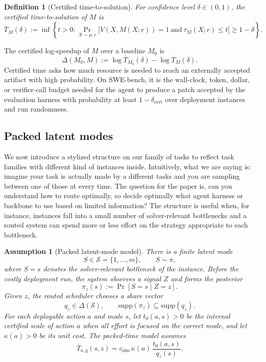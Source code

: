\documentclass{article}
\newtheorem{assumption}{Assumption}
\newtheorem{definition}{Definition}
\newcommand{\cS}{\mathcal{S}}
\begin{document}
\begin{definition}[Certified time-to-solution]
\label{def:certified-time}
For confidence level \(\delta\in(0,1)\), the certified time-to-solution
of \(M\) is
\[
    \overline T_M(\delta)
    :=
    \inf\left\{
        t>0:
        \Pr_{X\sim\mu,r}
        \big[
            V(X,M(X;r))=1
            \ \mathrm{and}\
            \tau_M(X;r)\le t
        \big]
        \ge 1-\delta
    \right\}.
\]
\end{definition}
The certified log-speedup of \(M\) over a baseline \(M_0\) is
\[
    \Delta(M_0,M)
    :=
    \log \overline T_{M_0}(\delta)
    -
    \log \overline T_M(\delta).
\]
Certified time asks how much resource is needed to reach an externally accepted artifact with high probability.
On SWE-bench, it is the wall-clock, token, dollar, or verifier-call budget needed for the agent to produce a patch accepted by the evaluation harness with probability at least \(1-\delta_{\mathrm{cert}}\) over deployment instances and run randomness.


\subsection{Packed latent modes}
\label{subsec:packed-latent-modes}

We now introduce a stylized structure on our family of tasks to reflect task families with different kind of instances inside. Intuitively, what we are saying is: imagine your task is actually made by a different tasks and you are sampling between one of those at every time.
The question for the paper is, can you understand how to route optimally, so decide optimally what agent harness or backbone to use based on limited information?
The structure is useful when, for instance, instances fall into a small number of solver-relevant bottlenecks and a routed system can spend more or less effort on the strategy appropriate to each bottleneck.

\begin{assumption}[Packed latent-mode model]
\label{ass:packed}
There is a finite latent mode
\[
    S\in\cS=\{1,\ldots,m\},\qquad S\sim\pi,
\]
where \(S=s\) denotes the solver-relevant bottleneck of the instance.
Before the costly deployment run, the system observes a signal \(Z\) and forms the posterior
\[
    \pi_z(s):=\Pr[S=s\mid Z=z].
\]
Given \(z\), the routed scheduler chooses a share vector
\[
    q_z\in\Delta(\cS),
    \qquad
    \mathrm{supp}(\pi_z)\subseteq \mathrm{supp}(q_z).
\]
For each deployable action \(a\) and mode \(s\), let \(t_0(a,s)>0\) be the internal
certified scale of action \(a\) when all effort is focused on the correct mode, and let
\(\kappa(a)>0\) be its unit cost.
The packed-time model assumes
\[
    \overline T_{a,q}(s,z)
    =
    c_{\mathrm{sim}}\,
    \kappa(a)\,
    \frac{t_0(a,s)}{q_z(s)} .
\]
\end{assumption}
\end{document}
